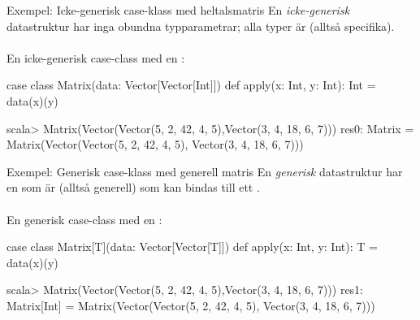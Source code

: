 



\begin{Slide}{Exempel: Icke-generisk case-klass med heltalsmatris}
  En \emph{icke-generisk} datastruktur har inga obundna typparametrar; alla typer är  (alltså specifika). \\~\\ En icke-generisk case-class med en :
  \begin{Code}
  case class Matrix(data: Vector[Vector[Int]]){
    def apply(x: Int, y: Int): Int = data(x)(y)
  }
  \end{Code}

  \begin{REPL}
  scala> Matrix(Vector(Vector(5, 2, 42, 4, 5),Vector(3, 4, 18, 6, 7)))
  res0: Matrix =
    Matrix(Vector(Vector(5, 2, 42, 4, 5), Vector(3, 4, 18, 6, 7)))
  \end{REPL}

\end{Slide}





\begin{Slide}{Exempel: Generisk case-klass med generell matris}
  En \emph{generisk} datastruktur har en  som är  (alltså generell) som kan bindas  till ett  . \\~\\
  En generisk case-class med en :
  \begin{Code}
  case class Matrix[T](data: Vector[Vector[T]]){
    def apply(x: Int, y: Int): T = data(x)(y)
  }
  \end{Code}

  \begin{REPL}
  scala> Matrix(Vector(Vector(5, 2, 42, 4, 5),Vector(3, 4, 18, 6, 7)))
  res1: Matrix[Int] =
    Matrix(Vector(Vector(5, 2, 42, 4, 5), Vector(3, 4, 18, 6, 7)))
  \end{REPL}

\end{Slide}




